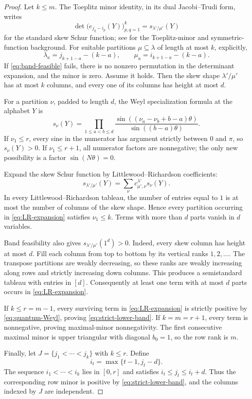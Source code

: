 \documentclass[11pt]{amsart}
\theoremstyle{definition}
\theoremstyle{remark}
\begin{document}
\begin{proof}
Let $k\le m$.  The Toeplitz minor identity, in its dual Jacobi--Trudi form, writes
\begin{equation}\label{eq:dual-JT}
 \det\bigl(e_{j_q-i_p}(Y)\bigr)_{p,q=1}^k
 =s_{\lambda'/\mu'}(Y)
\end{equation}
for the standard skew Schur function; see \cite{GarciaTierz,Macdonald} for the Toeplitz-minor and symmetric-function background.  For suitable partitions $\mu\subseteq\lambda$ of length at most $k$, explicitly,
\[
 \lambda_a=j_{k+1-a}-(k-a),
 \qquad
 \mu_a=i_{k+1-a}-(k-a).
\]
If \eqref{eq:band-feasible} fails, there is no nonzero permutation in the determinant expansion, and the minor is zero.  Assume it holds.  Then the skew shape $\lambda'/\mu'$ has at most $k$ columns, and every one of its columns has height at most $d$.

For a partition $\nu$, padded to length $d$, the Weyl specialization formula at the alphabet $Y$ is
\begin{equation}\label{eq:quantum-Weyl}
 s_\nu(Y)=
 \prod_{1\le a<b\le d}
 \frac{\sin((\nu_a-\nu_b+b-a)\theta)}
 {\sin((b-a)\theta)}.
\end{equation}
If $\nu_1\le r$, every sine in the numerator has argument strictly between $0$ and $\pi$, so $s_\nu(Y)>0$.  If $\nu_1\le r+1$, all numerator factors are nonnegative; the only new possibility is a factor $\sin(N\theta)=0$.

Expand the skew Schur function by Littlewood--Richardson coefficients:
\begin{equation}\label{eq:LR-expansion}
 s_{\lambda'/\mu'}(Y)
 =\sum_\nu c^{\lambda'}_{\mu',\nu}s_\nu(Y).
\end{equation}
In every Littlewood--Richardson tableau, the number of entries equal to $1$ is at most the number of columns of the skew shape.  Hence every partition occurring in \eqref{eq:LR-expansion} satisfies $\nu_1\le k$.  Terms with more than $d$ parts vanish in $d$ variables.

Band feasibility also gives $s_{\lambda'/\mu'}(1^d)>0$.  Indeed, every skew column has height at most $d$.  Fill each column from top to bottom by its vertical ranks $1,2,\ldots$.  The transpose partitions are weakly decreasing, so these ranks are weakly increasing along rows and strictly increasing down columns.  This produces a semistandard tableau with entries in $[d]$.  Consequently at least one term with at most $d$ parts occurs in \eqref{eq:LR-expansion}.

If $k\le r=m-1$, every surviving term in \eqref{eq:LR-expansion} is strictly positive by \eqref{eq:quantum-Weyl}, proving \eqref{eq:strict-lower-band}.  If $k=m=r+1$, every term is nonnegative, proving maximal-minor nonnegativity.  The first consecutive maximal minor is upper triangular with diagonal $b_0=1$, so the row rank is $m$.

Finally, let $J=\{j_1<\cdots<j_k\}$ with $k\le r$.  Define
\[
 i_t=\max\{t-1,j_t-d\}.
\]
The sequence $i_1<\cdots<i_k$ lies in $[0,r]$ and satisfies $i_t\le j_t\le i_t+d$.  Thus the corresponding row minor is positive by \eqref{eq:strict-lower-band}, and the columns indexed by $J$ are independent.
\end{proof}
\end{document}
